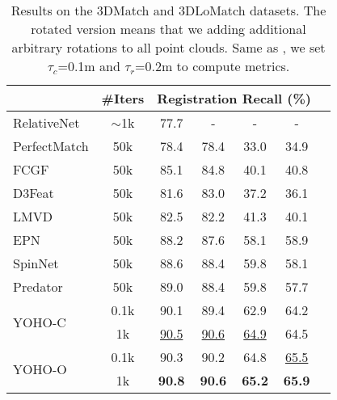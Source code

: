 \begin{table}[]
\begin{center}
{\begin{tabular}{lcccccc}
                             & \#Iters              & \multicolumn{4}{c}{Registration Recall (\%)}                  \\ \hline
RelativeNet\cite{deng20193d} & $\sim$1k             & 77.7          & -             & -             & -             \\
PerfectMatch\cite{smooth}    & 50k                  & 78.4          & 78.4          & 33.0          & 34.9          \\
FCGF\cite{FCGF}              & 50k                  & 85.1          & 84.8          & 40.1          & 40.8          \\
D3Feat\cite{d3feat}          & 50k                  & 81.6          & 83.0          & 37.2          & 36.1          \\
LMVD\cite{li2020end}         & 50k                  & 82.5          & 82.2          & 41.3          & 40.1          \\
EPN\cite{EPN}                & 50k                  & 88.2          & 87.6          & 58.1          & 58.9           \\
SpinNet\cite{ao2020spinnet}  & 50k                  & 88.6          & 88.4          & 59.8          & 58.1          \\
Predator\cite{predator}      & 50k                  & 89.0          & 88.4          & 59.8          & 57.7          \\
\multirow{2}{*}{YOHO-C}      & 0.1k                 & 90.1          & 89.4          & 62.9          & 64.2          \\
                             & 1k                   & \underline{90.5}    & \underline{90.6}    & \underline{64.9}    & 64.5          \\
\multirow{2}{*}{YOHO-O}      & 0.1k                 & 90.3          & 90.2          & 64.8          & \underline{65.5}    \\
                             & 1k                   & \textbf{90.8}          & \textbf{90.6} & \textbf{65.2} & \textbf{65.9} \\
\bottomrule[1.3pt]
\end{tabular}}
\end{center}
\caption{Results on the 3DMatch and 3DLoMatch datasets. The rotated version means that we adding additional arbitrary rotations to all point clouds. Same as \cite{ao2020spinnet,predator}, we set $\tau_{c}$=0.1m and $\tau_{r}$=0.2m to compute metrics.}
\label{tab:main}
\vspace{-20pt}
\end{table}



